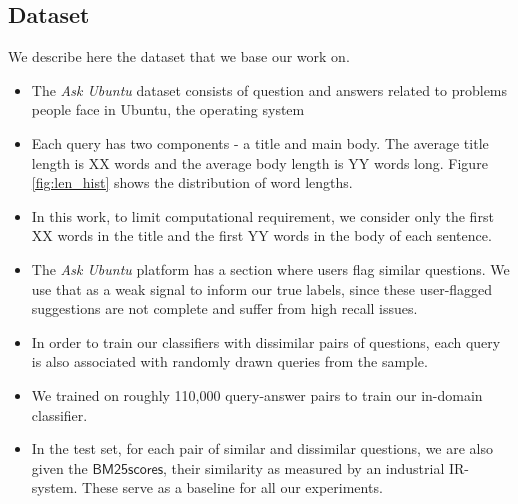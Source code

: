 \documentclass{sigkddExp}
\begin{document}
\subsection{Dataset}
We describe here the dataset that we base our work on.
\begin{itemize}[topsep=0pt,itemsep=-1ex,partopsep=1ex,parsep=1ex]
\item The \textit{Ask Ubuntu} dataset consists of question and answers related to problems people face in Ubuntu, the operating system
\item Each query has two components - a title and main body. The average title length is XX words and the average body length is YY words long. Figure \ref{fig:len_hist} shows the distribution of word lengths.
\item In this work, to limit computational requirement, we consider only the first XX words in the title and the first YY words in the body of each sentence.
\item The \textit{Ask Ubuntu} platform has a section where users flag similar questions. We use that as a weak signal to inform our true labels, since these user-flagged suggestions are not complete and suffer from high recall issues.
\item In order to train our classifiers with dissimilar pairs of questions, each query is also associated with randomly drawn queries from the sample.
\item We trained on roughly 110,000 query-answer pairs to train our in-domain classifier.
\item In the test set, for each pair of similar and dissimilar questions, we are also given the $\mathsf{BM25 scores}$, their similarity as measured by an industrial IR-system. These serve as a baseline for all our experiments.
\end{itemize}
\end{document}
